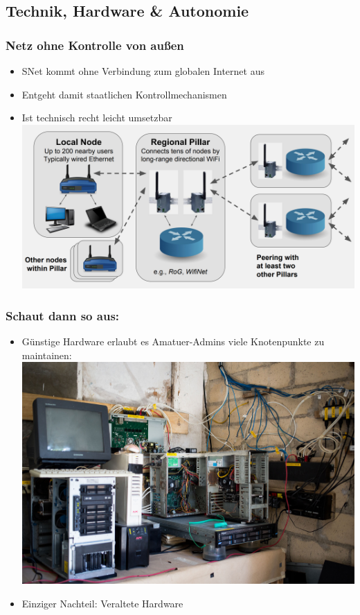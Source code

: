 \subsection{Technik, Hardware \& Autonomie}

\begin{frame}
\frametitle{Netz ohne Kontrolle von außen}
	\begin{itemize}
		\item SNet kommt ohne Verbindung zum globalen Internet aus
		\item Entgeht damit staatlichen Kontrollmechanismen
		\item Ist technisch recht leicht umsetzbar
			\includegraphics[width=\textwidth]{images/snet_tech.jpg}
	\end{itemize}
	
\end{frame}
		
\begin{frame}
\frametitle{Schaut dann so aus:}
	\begin{itemize}
		\item Günstige Hardware erlaubt es Amatuer-Admins viele Knotenpunkte zu maintainen:
			\includegraphics[width=\textwidth]{images/snet_pillar.jpg}
		\item Einziger Nachteil: Veraltete Hardware
	\end{itemize}
\end{frame}
